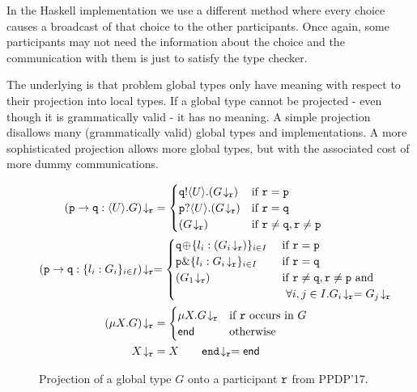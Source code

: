 \documentclass[runningheads,plain]{llncs}
\begin{document}
In the Haskell implementation we use a different method where every
choice causes a broadcast of that choice to the other participants. Once
again, some participants may not need the information about the choice
and the communication with them is just to satisfy the type checker.

The underlying is that problem global types only have meaning with
respect to their projection into local types. If a global type cannot be
projected - even though it is grammatically valid - it has no meaning. A
simple projection disallows many (grammatically valid) global types and
implementations. A more sophisticated projection allows more global
types, but with the associated cost of more dummy communications.

\begin{figure}[]
{
\begin{align*}
\tproj{(\gtcom{p}{q}{U}{G})}{\gpart{r}} & = 
\begin{cases}
\ltout{q}{U}{(\tproj{G}{\gpart{r}})} & \text{if $\gpart{r} = \gpart{p}$} \\
\ltinp{p}{U}{(\tproj{G}{\gpart{r}})} & \text{if $\gpart{r} = \gpart{q}$} \\
(\tproj{G}{\gpart{r}}) &  \text{if $\gpart{r} \neq \gpart{q}, \gpart{r} \neq \gpart{p}$}
\end{cases}
\\
\tproj{(\gtcho{p}{q}{l_i}{G_i})}{\gpart{r}}  
& 
{= 
\begin{cases}
\ltsel{q}{\lbl_i}{(\tproj{G_i}{\gpart{r}})}{i}{I}  & \text{ if $\gpart{r} = \gpart{p}$} \\
\ltbra{p}{\lbl_i}{\tproj{G_i}{\gpart{r}}}{i}{I}  & \text{ if $\gpart{r} = \gpart{q}$} \\
(\tproj{{G_1}}{\gpart{r}}) &  \text{ if $\gpart{r} \neq \gpart{q}, \gpart{r} \neq \gpart{p}$ and} \\ 
& \text{~~$\forall i, j \in I. \tproj{{G_i}}{\gpart{r}} = \tproj{{G_j}}{\gpart{r}}$}
\end{cases}
}
\\
\tproj{(\mu X. G)}{\gpart{r}} &= 
\begin{cases}
\mu X. \tproj{G}{\gpart{r}} & \text{if $\gpart{r}$ occurs in $G$}
\\
\lend & \text{otherwise}
\end{cases}
\\
\tproj{X}{\gpart{r}} & = X
\qquad
\tproj{\gend}{\gpart{r}} = \lend
\end{align*}
}
\vspace{-4mm}
\caption{Projection of a global type $G$ onto a participant $\mathtt{r}$ from PPDP'17.\label{f:proj}}
\end{figure}
\end{document}
